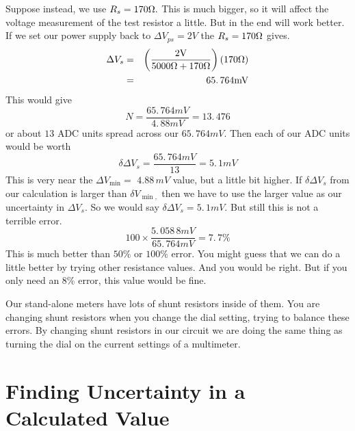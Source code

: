 Suppose instead, we use $R_{s}=170\unit{%
\Omega%
}.$ This is much bigger, so it will affect the voltage measurement of the
test resistor a little. But in the end will work better. If we set our power
supply back to $\Delta V_{ps}=2\unit{V}$ the $R_{s}=170\unit{%
\Omega%
}$ gives. 
\begin{eqnarray*}
\Delta V_{s} &=&\left( \frac{2\unit{V}}{5000\unit{%
\Omega%
}+170\unit{%
\Omega%
}}\right) \left( 170\unit{%
\Omega%
}\right) \\
&=&65.\,\allowbreak 764\unit{mV}
\end{eqnarray*}%
This would give 
\begin{equation*}
N=\frac{65.\,\allowbreak 764\unit{mV}}{4.\,\allowbreak 88\unit{mV}}%
=13.\,\allowbreak 476
\end{equation*}%
or about $13$ ADC units spread across our $65.\,\allowbreak 764\unit{mV}.$
Then each of our ADC units would be worth 
\begin{equation*}
\delta \Delta V_{s}=\frac{65.\,\allowbreak 764\unit{mV}}{13}=5.\,\allowbreak
1\unit{mV}
\end{equation*}%
This is very near the $\Delta V_{\min }=$ $4.88\,\allowbreak \unit{mV}$
value, but a little bit higher. If $\delta \Delta V_{s}$ from our
calculation is larger than $\delta V_{\min ,}$ then we have to use the
larger value as our uncertainty in $\Delta V_{s}.$ So we would say $\delta
\Delta V_{s}=5.\,\allowbreak 1\unit{mV}.$ But still this is not a terrible
error. 
\begin{equation*}
100\times \frac{5.\,\allowbreak 058\,8\unit{mV}}{65.\,\allowbreak 764\unit{mV%
}}=7.\,\allowbreak 7\%
\end{equation*}%
This is much better than $50\%$ or $100\%$ error. You might guess that we
can do a little better by trying other resistance values. And you would be
right. But if you only need an $8\%$ error, this value would be fine.

Our stand-alone meters have lots of shunt resistors inside of them. You are
changing shunt resistors when you change the dial setting, trying to balance
these errors. By changing shunt resistors in our circuit we are doing the
same thing as turning the dial on the current settings of a multimeter.

\section{Finding Uncertainty in a Calculated Value}

